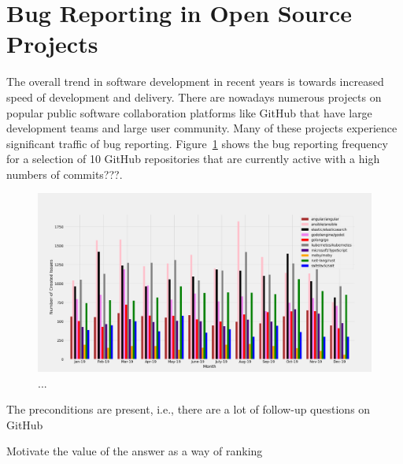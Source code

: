 \section{Bug Reporting in Open Source Projects}


The overall trend in software development in recent years is towards increased
speed of development and delivery. There are nowadays numerous projects on popular
public software collaboration platforms like GitHub that have large development
teams and large user community. Many of these projects experience significant
traffic of bug reporting. Figure~\ref{fig:repo_activity} shows the bug reporting
frequency for a selection of 10 GitHub repositories that are currently active
with a high numbers of commits???. 

\begin{figure}[t]
\centering
\includegraphics[width=0.99\linewidth]{figures/repos_month_bar.png}
\caption{...}
\label{fig:repo_activity}
\end{figure}



The preconditions are present, i.e., there are a lot of follow-up questions on GitHub






Motivate the value of the answer as a way of ranking
